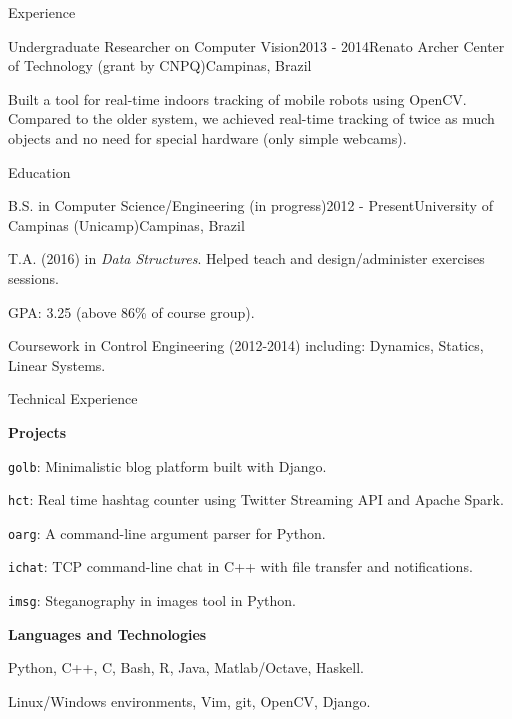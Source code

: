 \documentclass[8pt]{resume}
\newcommand{\tit}[1]{\textit{#1}}
\newcommand{\tbf}[1]{\textbf{#1}}
\newcommand{\ttt}[1]{\texttt{#1}}
\begin{document}
\begin{rSection}{Experience}
\begin{rSubsection}{Undergraduate Researcher on Computer Vision}{2013 - 2014}{Renato Archer Center of Technology (grant by CNPQ)}{Campinas, Brazil}
    \item Built a tool for real-time indoors tracking of
        mobile robots using OpenCV\@. Compared to the older system,
        we achieved real-time tracking of twice as much objects
        and no need for special hardware (only simple webcams).
\end{rSubsection}

\end{rSection}

\begin{rSection}{Education}

    \begin{rSubsection}{B.S. in Computer Science/Engineering (in progress)}{2012 - Present}{University of Campinas (Unicamp)}{Campinas, Brazil}
    \item T.A. (2016) in \tit{Data Structures}. Helped
        teach and design/administer exercises sessions.
    \item GPA: 3.25 (above 86\% of course group).
    \item Coursework in Control Engineering (2012-2014) including:
        Dynamics, Statics, Linear Systems.
\end{rSubsection}

\end{rSection}

\begin{rSection}{Technical Experience}


\tbf{Projects}
\begin{rSubsection}{}{}{}{}
    \item \ttt{golb}: Minimalistic blog platform built with Django.
    \item \ttt{hct}: Real time hashtag counter using Twitter Streaming API and
        Apache Spark.
    \item \ttt{oarg}: A command-line argument parser for Python.
    \item \ttt{ichat}: TCP command-line chat in C++ with file transfer and
        notifications.
    \item \ttt{imsg}: Steganography in images tool in Python.
\end{rSubsection}

\tbf{Languages and Technologies}
\begin{rSubsection}{}{}{}{}
    \item Python, C++, C, Bash, R, Java, Matlab/Octave, Haskell. %
    \item Linux/Windows environments, Vim, git, OpenCV, Django.
\end{rSubsection}
\end{rSection}
\end{document}
